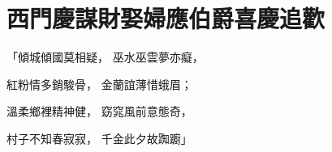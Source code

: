 %

\chapter{西門慶謀財娶婦\KG 應伯爵喜慶追歡}

\begin{showcontents}{}



「傾城傾國莫相疑，  巫水巫雲夢亦癡，

紅粉情多銷駿骨，  金蘭誼薄惜蛾眉；

溫柔鄉裡精神健，  窈窕風前意態奇，

村子不知春寂寂，  千金此夕故踟躕」


\end{showcontents}
